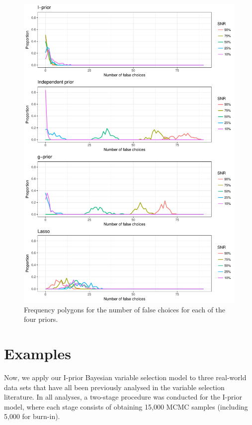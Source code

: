 \documentclass[a4paper,showframe,11pt]{report}
\begin{document}
\begin{figure}[p]
  \centering
  \includegraphics[scale=0.68]{figure/bvs_simres}
  \vspace{-1mm}
  \caption{Frequency polygons for the number of false choices for each of the four priors.}
  \label{fig:simres}
\end{figure}

\section{Examples}

Now, we apply our I-prior Bayesian variable selection model to three real-world data sets that have all been previously analysed in the variable selection literature.
In all analyses, a two-stage procedure was conducted for the I-prior model, where each stage consists of obtaining 15,000 MCMC samples (including 5,000 for burn-in).
\end{document}
